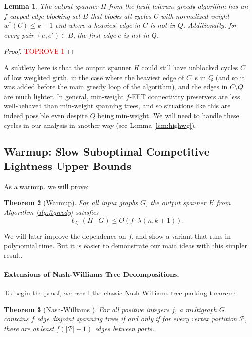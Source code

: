 \documentclass{article}
\theoremstyle{plain}
\newtheorem{theorem}{Theorem}
\newtheorem{lemma}[theorem]{Lemma}
\theoremstyle{definition}
\begin{document}
\begin{lemma} \label{lem:bsetexists}
The output spanner $H$ from the fault-tolerant greedy algorithm has an $f$-capped edge-blocking set $B$ that blocks all cycles $C$ with normalized weight $w^*(C) \le k+1$ and where a heaviest edge in $C$ is not in $Q$.
Additionally, for every pair $(e, e') \in B$, the first edge $e$ is not in $Q$.
\end{lemma}
\begin{proof}\textcolor{red}{TOPROVE 1}\end{proof}

A subtlety here is that the output spanner $H$ could still have unblocked cycles $C$ of low weighted girth, in the case where the heaviest edge of $C$ is in $Q$ (and so it was added before the main greedy loop of the algorithm), and the edges in $C \setminus Q$ are much lighter.
In general, min-weight $f$-EFT connectivity preservers are less well-behaved than min-weight spanning trees, and so situations like this are indeed possible even despite $Q$ being min-weight.
We will need to handle these cycles in our analysis in another way (see Lemma \ref{lem:highwg}).


\subsection{Warmup: Slow Suboptimal Competitive Lightness Upper Bounds} \label{sec:warmup}

As a warmup, we will prove:
\begin{theorem} [Warmup] \label{thm:mainbadf}
For all input graphs $G$, the output spanner $H$ from Algorithm \ref{alg:ftgreedy} satisfies
$$\ell_{2f}(H \mid G) \le O\left( f \cdot \lambda(n, k+1) \right).$$
\end{theorem}

We will later improve the dependence on $f$, and show a variant that runs in polynomial time.  But it is easier to demonstrate our main ideas with this simpler result. 

\paragraph{Extensions of Nash-Williams Tree Decompositions.}

To begin the proof, we recall the classic Nash-Williams tree packing theorem:
\begin{theorem} [Nash-Williams \cite{NashWilliams}] \label{thm:NW}
For all positive integers $f$, a multigraph $G$ contains $f$ edge disjoint spanning trees if and only if for every vertex partition $\mathcal{P}$, there are at least $f(|\mathcal{P}|-1)$ edges between parts.
\end{theorem}
\end{document}
